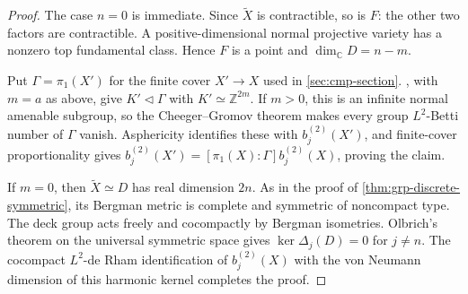\documentclass[11pt,a4paper]{amsart}
\begin{document}
\begin{proof}
The case $n=0$ is immediate. Since $\widetilde X$ is contractible, so is $F$: the other two factors are contractible. A positive-dimensional normal projective variety has a nonzero top fundamental class. Hence $F$ is a point and $\dim_{\mathbb{C}}D=n-m$.

Put $\Gamma=\pi_1(X')$ for the finite cover $X'\to X$ used in \cref{sec:cmp-section}. , with $m=a$ as above, give $K'\lhd\Gamma$ with $K'\simeq\mathbb{Z}^{2m}$. If $m>0$, this is an infinite normal amenable subgroup, so the Cheeger--Gromov theorem \cite[Theorem~0.3(3) and the proof of Corollary~0.6]{CheegerGromov1986} makes every group $L^2$-Betti number of $\Gamma$ vanish. Asphericity identifies these with $b_j^{(2)}(X')$, and finite-cover proportionality gives $b_j^{(2)}(X')=[\pi_1(X):\Gamma]b_j^{(2)}(X)$, proving the claim.

If $m=0$, then $\widetilde X\simeq D$ has real dimension $2n$. As in the proof of \cref{thm:grp-discrete-symmetric}, its Bergman metric is complete and symmetric of noncompact type. The deck group acts freely and cocompactly by Bergman isometries. Olbrich's theorem on the universal symmetric space \cite[Proposition~1.2 and \S4]{Olbrich2002} gives $\ker\Delta_j(D)=0$ for $j\ne n$. The cocompact $L^2$-de Rham identification of $b_j^{(2)}(X)$ with the von Neumann dimension of this harmonic kernel completes the proof.
\end{proof}



\printbibliography
\end{document}
